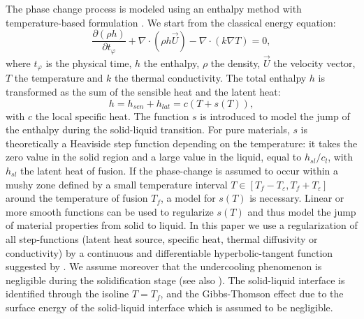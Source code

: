 The phase change process is modeled using an enthalpy method with temperature-based formulation  \citep{voller1987pcm,Cao1989,Cao1990}. We start from the classical energy equation:
\begin{equation}
\label{eq-energie}
   \frac{\partial (\rho h)}{\partial t_{\varphi}} + \nabla \cdot(\rho h \vec{U}) - \nabla \cdot (k \nabla T) = 0,
\end{equation}
where $t_{\varphi}$ is the physical time, $h$ the enthalpy, $\rho$ the density, $\vec{U}$  the velocity vector, $T$ the temperature and $k$ the thermal conductivity. 
The total enthalpy $h$ is transformed as the sum of the sensible heat and the latent heat:
\begin{equation}
\label{eq-enth-model}
  h = h_{sen} + h_{lat} = c ( T + s(T) ),
\end{equation} 
with $c$ the local specific heat. The function $s$ is introduced to model the jump of the enthalpy during the solid-liquid transition.  For pure materials, $s$ is theoretically  a Heaviside step function depending on the temperature: it takes the zero value in the solid region and a large value in the liquid, equal to $h_{sl}/c_l$, with $h_{sl}$ the latent heat of fusion. If the phase-change is assumed to occur within a mushy zone defined by a small temperature interval $  T \in [T_f - T_\varepsilon, T_f + T_\varepsilon] $ around the temperature of fusion $T_f$, a model for $s(T)$ is necessary. Linear  \citep{voller1987pcm,Wang2010} or more smooth functions \citep{dan-2014-JCP} can be used to regularize $s(T)$ and thus model the jump of material properties from solid to liquid.  In this paper we use a regularization of all step-functions (latent heat source, specific heat, thermal diffusivity or conductivity) by a continuous and differentiable hyperbolic-tangent function suggested by \cite{dan-2014-JCP}.
We assume moreover that the undercooling phenomenon is negligible during the solidification stage (see also \cite{wang2010numerical,kowalewski2004phase}).
The solid-liquid interface is identified through the isoline $T=T_f$, and the Gibbs-Thomson effect due to the surface energy of the solid-liquid interface which is assumed to be negligible.%



